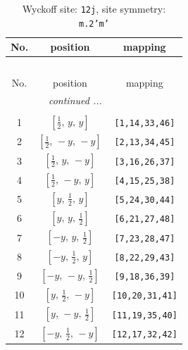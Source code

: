 \documentclass[fleqn,8pt]{jsarticle}
\begin{document}
\begin{longtable}{ccc}
\caption{Wyckoff site: {\tt 12j}, site symmetry: {\tt m.2'm'}}
 \\
 \hline \hline
No. & position & mapping \\ \hline \endfirsthead

\multicolumn{2}{l}{\tablename\ \thetable{}} \\
 \hline \hline
No. & position & mapping \\ \hline \endhead

 \hline \hline
\multicolumn{2}{r}{\footnotesize\it continued ...} \\ \endfoot

 \hline \hline
\multicolumn{2}{r}{} \\ \endlastfoot

1 & $\left[ \frac{1}{2},\, y,\, y \right]$ & {\tt [1,14,33,46]} \\ \hline
2 & $\left[ \frac{1}{2},\, - y,\, - y \right]$ & {\tt [2,13,34,45]} \\ \hline
3 & $\left[ \frac{1}{2},\, y,\, - y \right]$ & {\tt [3,16,26,37]} \\ \hline
4 & $\left[ \frac{1}{2},\, - y,\, y \right]$ & {\tt [4,15,25,38]} \\ \hline
5 & $\left[ y,\, \frac{1}{2},\, y \right]$ & {\tt [5,24,30,44]} \\ \hline
6 & $\left[ y,\, y,\, \frac{1}{2} \right]$ & {\tt [6,21,27,48]} \\ \hline
7 & $\left[ - y,\, y,\, \frac{1}{2} \right]$ & {\tt [7,23,28,47]} \\ \hline
8 & $\left[ - y,\, \frac{1}{2},\, y \right]$ & {\tt [8,22,29,43]} \\ \hline
9 & $\left[ - y,\, - y,\, \frac{1}{2} \right]$ & {\tt [9,18,36,39]} \\ \hline
10 & $\left[ y,\, \frac{1}{2},\, - y \right]$ & {\tt [10,20,31,41]} \\ \hline
11 & $\left[ y,\, - y,\, \frac{1}{2} \right]$ & {\tt [11,19,35,40]} \\ \hline
12 & $\left[ - y,\, \frac{1}{2},\, - y \right]$ & {\tt [12,17,32,42]} \\
\end{longtable}
\renewcommand{\arraystretch}{1.2}
\end{document}

